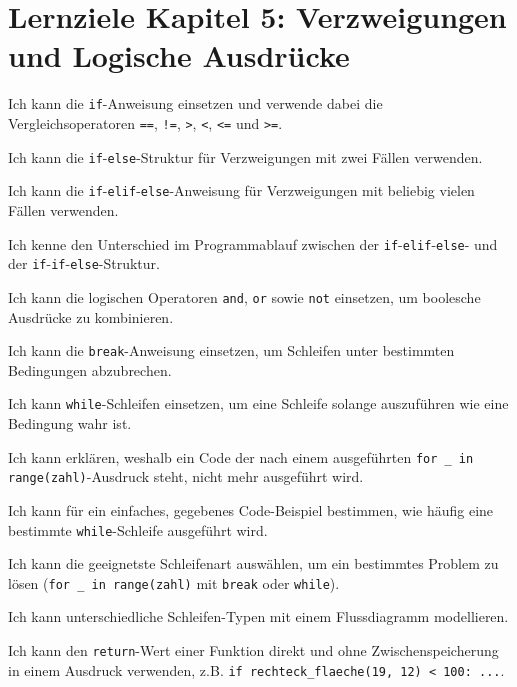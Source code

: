 \section*{Lernziele Kapitel 5: Verzweigungen und Logische Ausdrücke}
\begin{todolist}
    \item Ich kann die \lstinline|if|-Anweisung einsetzen und verwende dabei die Vergleichsoperatoren \lstinline|==|, \lstinline|!=|, \lstinline|>|, \lstinline|<|, \lstinline|<=| und \lstinline|>=|.
    \item Ich kann die \lstinline|if|-\lstinline|else|-Struktur für Verzweigungen mit zwei Fällen verwenden.
    \item Ich kann die \lstinline|if|-\lstinline|elif|-\lstinline|else|-Anweisung für Verzweigungen mit beliebig vielen Fällen verwenden.
    \item Ich kenne den Unterschied im Programmablauf zwischen der \lstinline|if|-\lstinline|elif|-\lstinline|else|- und der \lstinline|if|-\lstinline|if|-\lstinline|else|-Struktur.
    \item Ich kann die logischen Operatoren \lstinline|and|, \lstinline|or| sowie \lstinline|not| einsetzen, um boolesche Ausdrücke zu kombinieren.
    \item Ich kann die \lstinline|break|-Anweisung einsetzen, um Schleifen unter bestimmten Bedingungen abzubrechen.
    \item Ich kann \lstinline|while|-Schleifen einsetzen, um eine Schleife solange auszuführen wie eine Bedingung wahr ist.
    \item Ich kann erklären, weshalb ein Code der nach einem ausgeführten \lstinline|for _ in range(zahl)|-Ausdruck steht, nicht mehr ausgeführt wird.
    \item Ich kann für ein einfaches, gegebenes Code-Beispiel bestimmen, wie häufig eine bestimmte \lstinline|while|-Schleife ausgeführt wird.
    \item Ich kann die geeignetste Schleifenart auswählen, um ein bestimmtes Problem zu lösen (\lstinline|for _ in range(zahl)| mit \lstinline|break| oder \lstinline|while|).
    \item Ich kann unterschiedliche Schleifen-Typen mit einem Flussdiagramm modellieren.
    \item Ich kann den \lstinline|return|-Wert einer Funktion direkt und ohne Zwischenspeicherung in einem Ausdruck verwenden, z.B. \lstinline|if rechteck_flaeche(19, 12) < 100: ...|.
\end{todolist}

